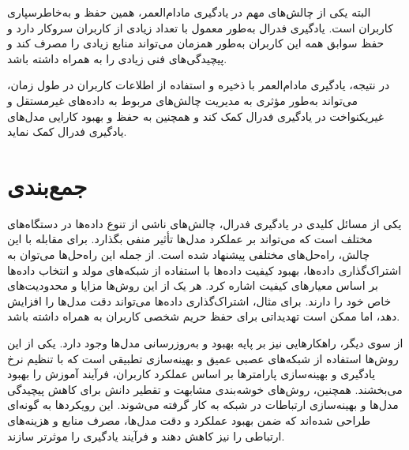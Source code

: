 البته یکی از چالش‌های مهم در یادگیری مادام‌العمر، همین حفظ و به‌خاطرسپاری کاربران است. یادگیری فدرال به‌طور معمول با تعداد زیادی از کاربران سروکار دارد و حفظ سوابق همه این کاربران به‌طور همزمان می‌تواند منابع زیادی را مصرف کند و پیچیدگی‌های فنی زیادی را به همراه داشته باشد.

در نتیجه، یادگیری مادام‌العمر با ذخیره و استفاده از اطلاعات کاربران در طول زمان، می‌تواند به‌طور مؤثری به مدیریت چالش‌های مربوط به داده‌های غیرمستقل و غیریکنواخت در یادگیری فدرال کمک کند و همچنین به حفظ و بهبود کارایی مدل‌های یادگیری فدرال کمک نماید.


\section{جمع‌بندی}
یکی از مسائل کلیدی در یادگیری فدرال، چالش‌های ناشی از تنوع داده‌ها در دستگاه‌های مختلف است که می‌تواند بر عملکرد مدل‌ها تأثیر منفی بگذارد. برای مقابله با این چالش، راه‌حل‌های مختلفی پیشنهاد شده است. از جمله این راه‌حل‌ها می‌توان به اشتراک‌گذاری داده‌ها، بهبود کیفیت داده‌ها با استفاده از شبکه‌های مولد و انتخاب داده‌ها بر اساس معیارهای کیفیت اشاره کرد. هر یک از این روش‌ها مزایا و محدودیت‌های خاص خود را دارند. برای مثال، اشتراک‌گذاری داده‌ها می‌تواند دقت مدل‌ها را افزایش دهد، اما ممکن است تهدیداتی برای حفظ حریم شخصی کاربران به همراه داشته باشد.

از سوی دیگر، راهکارهایی نیز بر پایه بهبود و به‌روزرسانی مدل‌ها وجود دارد. یکی از این روش‌ها استفاده از شبکه‌های عصبی عمیق و بهینه‌سازی تطبیقی است که با تنظیم نرخ یادگیری و بهینه‌سازی پارامترها بر اساس عملکرد کاربران، فرآیند آموزش را بهبود می‌بخشند. همچنین، روش‌های خوشه‌بندی مشابهت و تقطیر دانش برای کاهش پیچیدگی مدل‌ها و بهینه‌سازی ارتباطات در شبکه به کار گرفته می‌شوند. این رویکردها به گونه‌ای طراحی شده‌اند که ضمن بهبود عملکرد و دقت مدل‌ها، مصرف منابع و هزینه‌های ارتباطی را نیز کاهش دهند و فرآیند یادگیری را موثرتر سازند.
